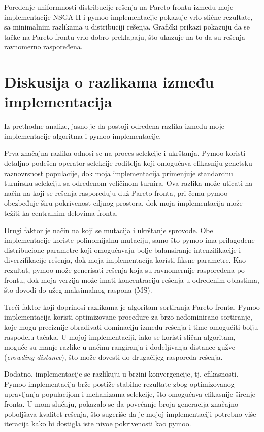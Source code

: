\documentclass[12pt]{article}
\begin{document}
Poređenje uniformnosti distribucije rešenja na Pareto frontu između moje implementacije NSGA-II i pymoo implementacije pokazuje vrlo slične rezultate, sa minimalnim razlikama u distribuciji rešenja. Grafički prikazi pokazuju da se tačke na Pareto frontu vrlo dobro preklapaju, što ukazuje na to da su rešenja ravnomerno raspoređena.

\section{Diskusija o razlikama između implementacija}
Iz prethodne analize, jasno je da postoji određena razlika između moje implementacije algoritma i pymoo implementacije.

Prva značajna razlika odnosi se na proces selekcije i ukrštanja.
Pymoo koristi detaljno podešen operator selekcije roditelja koji omogućava efikasniju genetsku raznovrsnost populacije, dok moja implementacija primenjuje standardnu turnirsku selekciju sa određenom veličinom turnira.  Ova razlika može uticati na način na koji se rešenja raspoređuju duž Pareto fronta, pri čemu pymoo obezbeđuje širu pokrivenost ciljnog prostora, dok moja implementacija može težiti ka centralnim delovima fronta.

Drugi faktor je način na koji se mutacija i ukrštanje sprovode. Obe implementacije koriste polinomijalnu mutaciju, samo što pymoo ima prilagođene distribucione parametre koji omogućavaju bolje balansiranje intenzifikacije i diverzifikacije rešenja, dok moja implementacija koristi fiksne parametre.  Kao rezultat, pymoo može generisati rešenja koja su ravnomernije raspoređena po frontu, dok moja verzija može imati koncentraciju rešenja u određenim oblastima, što dovodi do užeg maksimalnog raspona (MS).

Treći faktor koji doprinosi razlikama je algoritam sortiranja Pareto fronta. Pymoo implementacija koristi optimizovane procedure za brzo nedominirano sortiranje, koje mogu preciznije obrađivati dominaciju između rešenja i time omogućiti bolju raspodelu tačaka. U mojoj implementaciji, iako se koristi sličan algoritam, moguće su manje razlike u načinu rangiranja i dodeljivanja distance gužve (\textit{crowding distance}), što može dovesti do drugačijeg rasporeda rešenja.

Dodatno, implementacije se razlikuju u brzini konvergencije, tj. efikasnosti. Pymoo implementacija brže postiže stabilne rezultate zbog optimizovanog upravljanja populacijom i mehanizama selekcije, što omogućava efikasnije širenje fronta. U mom slučaju, pokazalo se da povećanje broja generacija značajno poboljšava kvalitet rešenja, što sugeriše da je mojoj implementaciji potrebno više iteracija kako bi dostigla iste nivoe pokrivenosti kao pymoo.
\end{document}
